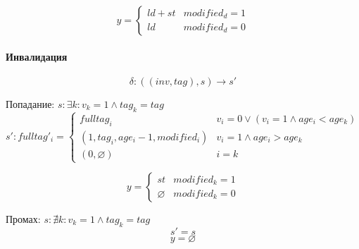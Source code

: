 \[
y =
\begin{cases}
	ld+st & modified_d = 1 \\
	ld & modified_d = 0
\end{cases}
\]

\paragraph*{Инвалидация}

$$\delta : ((inv,tag),s) \rightarrow s'$$

Попадание: $s: \exists k : v_k = 1 \land tag_k = tag$
\[
s':fulltag'_i =
\begin{cases}
	fulltag_i & v_i = 0 \lor (v_i = 1 \land age_i < age_k)\\
	(1,tag_i,age_{i}-1,modified_i) & v_i = 1 \land age_i > age_k \\
	(0,\varnothing) & i = k
\end{cases}
\]

\[
y =
\begin{cases}
	st & modified_k = 1 \\
	\varnothing & modified_k = 0
\end{cases}
\]

Промах: $s: \nexists k : v_k = 1 \land tag_k = tag$
$$s' = s$$
$$y = \varnothing$$



